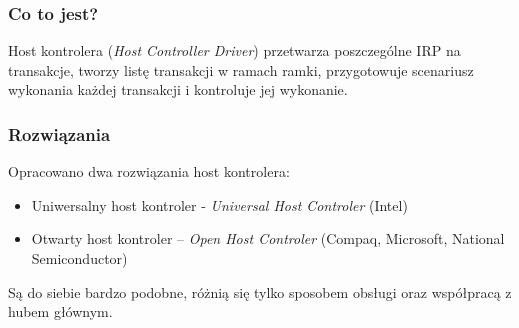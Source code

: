 	\subsubsection{Co to jest?}
	Host kontrolera (\emph{Host Controller Driver}) przetwarza poszczególne IRP na transakcje, tworzy listę transakcji  w ramach ramki, przygotowuje scenariusz wykonania każdej transakcji i kontroluje jej wykonanie.
	\subsubsection{Rozwiązania}
	Opracowano dwa rozwiązania host kontrolera:
	\begin{itemize}
		\item Uniwersalny host kontroler - \emph{Universal Host Controler} (Intel)
		\item Otwarty host kontroler – \emph{Open Host Controler} (Compaq, Microsoft, National Semiconductor)
	\end{itemize}
	Są do siebie bardzo podobne, różnią się tylko sposobem obsługi oraz współpracą z hubem głównym.
